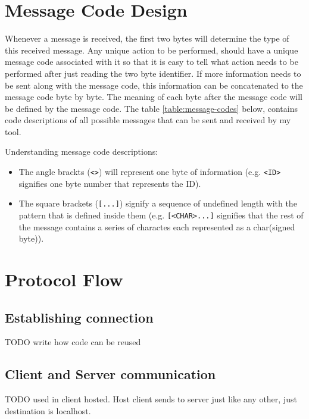 \newpage

\section{Message Code Design}
Whenever a message is received, the first two bytes will determine the type of this received message. Any unique action to be performed, should have a unique message code associated with it so that it is easy to tell what action needs to be performed after just reading the two byte identifier. If more information needs to be sent along with the message code, this information can be concatenated to the message code byte by byte. The meaning of each byte after the message code will be defined by the message code. The table \ref{table:message-codes} below, contains code descriptions of all possible messages that can be sent and received by my tool.

Understanding message code descriptions:
\begin{itemize}
\item The angle brackts (\lstinline{<>}) will represent one byte of information (e.g. \lstinline{<ID>} signifies one byte number that represents the ID).
\item The square brackets (\lstinline{[...]}) signify a sequence of undefined length with the pattern that is defined inside them (e.g. \lstinline{[<CHAR>...]} signifies that the rest of the message contains a series of charactes each represented as a char(signed byte)).
\end{itemize}
\vfill


\newpage

\section{Protocol Flow}

\subsection{Establishing connection}
TODO write how code can be reused


\newpage


\subsection{Client and Server communication}
TODO used in client hosted. Host client sends to server just like any other, just destination is localhost.

